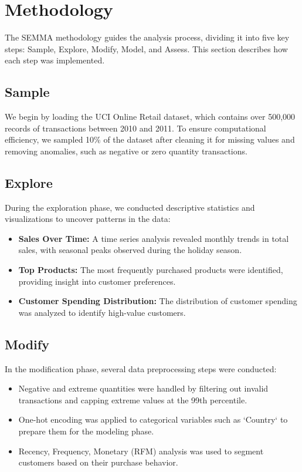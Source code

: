 \documentclass[12pt]{article}
\begin{document}
\section{Methodology}
The SEMMA methodology guides the analysis process, dividing it into five key steps: Sample, Explore, Modify, Model, and Assess. This section describes how each step was implemented.

\subsection{Sample}
We begin by loading the UCI Online Retail dataset, which contains over 500,000 records of transactions between 2010 and 2011. To ensure computational efficiency, we sampled 10\% of the dataset after cleaning it for missing values and removing anomalies, such as negative or zero quantity transactions.

\subsection{Explore}
During the exploration phase, we conducted descriptive statistics and visualizations to uncover patterns in the data:
\begin{itemize}
    \item \textbf{Sales Over Time:} A time series analysis revealed monthly trends in total sales, with seasonal peaks observed during the holiday season.
    \item \textbf{Top Products:} The most frequently purchased products were identified, providing insight into customer preferences.
    \item \textbf{Customer Spending Distribution:} The distribution of customer spending was analyzed to identify high-value customers.
\end{itemize}

\subsection{Modify}
In the modification phase, several data preprocessing steps were conducted:
\begin{itemize}
    \item Negative and extreme quantities were handled by filtering out invalid transactions and capping extreme values at the 99th percentile.
    \item One-hot encoding was applied to categorical variables such as `Country` to prepare them for the modeling phase.
    \item Recency, Frequency, Monetary (RFM) analysis was used to segment customers based on their purchase behavior.
\end{itemize}
\end{document}
